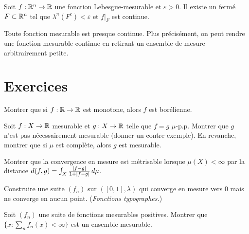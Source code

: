 \begin{theoreme}[Lusin]
\label{thm:lusin}
Soit $f : \mathbb{R}^n \to \mathbb{R}$ une fonction Lebesgue-mesurable et $\varepsilon > 0$.
Il existe un ferm\'e $F \subset \mathbb{R}^n$ tel que $\lambda^n(F^c) < \varepsilon$ et
$f|_F$ est continue.
\end{theoreme}

\begin{intuition}[title=\textbf{Interpr\'etation de Lusin}]
\og Toute fonction mesurable est presque continue. \fg Plus pr\'ecis\'ement,
on peut rendre une fonction mesurable continue en retirant un ensemble de mesure
arbitrairement petite.
\end{intuition}

\section{Exercices}

\begin{exercice}
Montrer que si $f : \mathbb{R} \to \mathbb{R}$ est monotone, alors $f$ est bor\'elienne.
\end{exercice}

\begin{exercice}
Soit $f : X \to \mathbb{R}$ mesurable et $g : X \to \mathbb{R}$ telle que $f = g$ $\mu$-p.p.
Montrer que $g$ n'est pas n\'ecessairement mesurable (donner un contre-exemple).
En revanche, montrer que si $\mu$ est compl\`ete, alors $g$ est mesurable.
\end{exercice}

\begin{exercice}
Montrer que la convergence en mesure est m\'etrisable lorsque $\mu(X) < \infty$
par la distance $d(f, g) = \int_X \frac{\left| f - g \right|}{1 + \left| f - g \right|}\, d\mu$.
\end{exercice}

\begin{exercice}
Construire une suite $(f_n)$ sur $([0,1], \lambda)$ qui converge en mesure vers $0$
mais ne converge en aucun point. (\emph{Fonctions typographes.})
\end{exercice}

\begin{exercice}
Soit $(f_n)$ une suite de fonctions mesurables positives. Montrer que
$\{x : \sum_n f_n(x) < \infty\}$ est un ensemble mesurable.
\end{exercice}

